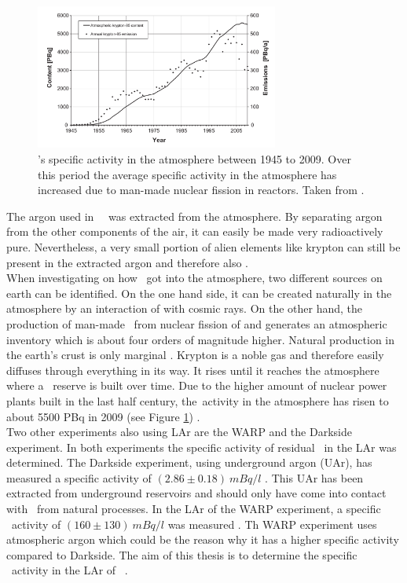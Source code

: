 \documentclass[encoding=utf8,british]{tumphthesis}
\begin{document}
\begin{figure}[t!]
	\centering
	\ifmakefigures%
	\includegraphics[width=80mm]{./Bilder/Kr85Aenderung.png}
	\fi%
	\caption{
	    \Kr's specific activity in the atmosphere between 1945 to 2009. 
	    Over this period the average specific activity in the atmosphere has increased due to man-made nuclear fission in reactors. 
		Taken from \cite{ahlswede_update_2013}.
	}
    \label{fig:Kr85Aenderung}
    
\end{figure}

The argon used in \gerda\ \PII\ was extracted from the atmosphere.
By separating argon from the other components of the air, it can easily be made very radioactively pure.
Nevertheless, a very small portion of alien elements like krypton can still be present in the extracted argon and therefore also \Kr.
\\

When investigating on how  \Kr\ got into the atmosphere, two different sources on earth can be identified.
On the one hand side, it can be created naturally in the atmosphere by an interaction of  with cosmic rays.
On the other hand, the production of man-made \Kr\ from nuclear fission of  and  generates an atmospheric inventory which is about four orders of magnitude higher.
Natural production in the earth's crust is only marginal \cite{winger_new_2005}.
Krypton is a noble gas and therefore easily diffuses through everything in its way.
It rises until it reaches the atmosphere where a \Kr\ reserve is built over time.  
Due to the higher amount of nuclear power plants built in the last half century, the\Kr\ activity in the atmosphere has risen to about 5500 PBq in 2009 \cite{ahlswede_update_2013} (see Figure \ref{fig:Kr85Aenderung}) .
\\

Two other experiments also using LAr are the WARP and the Darkside experiment.
In both experiments the specific activity of residual \Kr\ in the LAr was determined.
The Darkside experiment, using underground argon (UAr), has measured a specific activity of \((2.86\pm0.18) \ \unit{mBq}/\unit{l}\)  \cite{agnes_results_2016}.
This UAr has been extracted from underground reservoirs and should only have come into contact with \Kr\ from natural processes.
In the LAr of the WARP experiment, a specific \Kr\ activity of   \((160\pm130) \ \unit{mBq}/\unit{l}\) was measured \cite{benetti_measurement_2006}.
Th WARP experiment uses atmospheric argon which could be the reason why it has a higher specific activity compared to Darkside.
The aim of this thesis is to determine the specific \Kr\ activity in the LAr of \gerda\ \PII.
\end{document}
